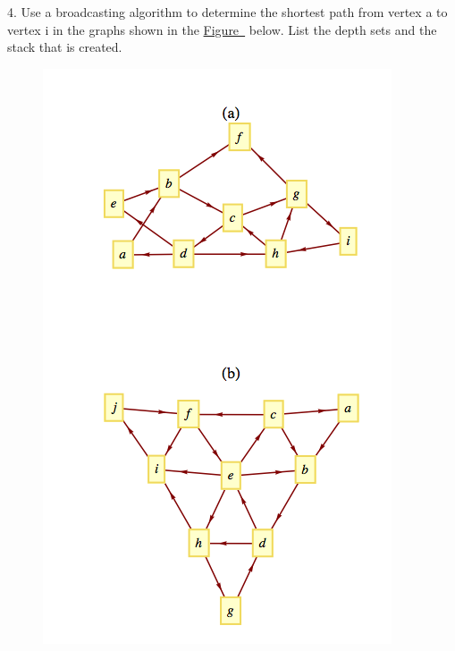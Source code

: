 \documentclass[10pt,]{book}
\theoremstyle{plain}
\theoremstyle{definition}
\theoremstyle{definition}
\theoremstyle{definition}
\theoremstyle{definition}
\theoremstyle{definition}
\numberwithin{equation}{section}
\begin{document}
\begin{exercisegroup}
%
\item[4.]\hypertarget{exercise-19}{}Use a broadcasting algorithm to determine the shortest path from vertex a to vertex i in the graphs shown in the \hyperref[fig-exercise-9-3-4]{Figure~} below. List the depth sets
and the stack that is created.%
\leavevmode%
\begin{figure}
\centering
\includegraphics[width=1\linewidth]{images/fig-exercise-9-3-4.png}
\end{figure}
\par\smallskip
\end{exercisegroup}
\par\smallskip\noindent
\end{document}
